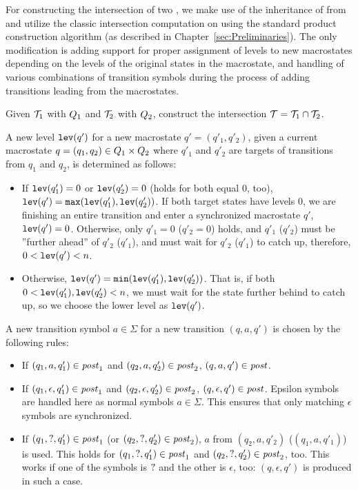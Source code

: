 For constructing the intersection of two \nfts, we make use of the inheritance of \nfts from \nfas and utilize the classic intersection computation on \nfa using the standard product construction algorithm (as described in Chapter~\ref{sec:Preliminaries}).
The only modification is adding support for proper assignment of levels to new macrostates depending on the levels of the original \nft states in the macrostate, and handling of various combinations of transition symbols during the process of adding transitions leading from the macrostates.

Given $\mathcal{T}_1$ with $Q_1$ and $\mathcal{T}_2$ with $Q_2$, construct the intersection $\mathcal{T} = \mathcal{T}_1 \cap \mathcal{T}_2$.

A new level $\texttt{lev}(q')$ for a new macrostate $q' = (q'_1, q'_2)$, given a current macrostate $q = (q_1, q_2) \in Q_1 \times Q_2$ where $q'_1$ and $q'_2$ are targets of transitions from $q_1$ and $q_2$, is determined as follows:
\begin{itemize}
  \item If $\texttt{lev}(q'_1) = 0$ or $\texttt{lev}(q'_2) = 0$ (holds for both equal $0$, too),\\ $\texttt{lev}(q') = \texttt{max}(\texttt{lev}(q'_1), \texttt{lev}(q'_2))$. If both target states have levels $0$, we are finishing an entire \nft transition and enter a synchronized macrostate $q'$, $\texttt{lev}(q') = 0$. Otherwise, only $q'_1 = 0$ ($q'_2 = 0$) holds, and $q'_1$ ($q'_2$) must be ''further ahead'' of $q'_2$ ($q'_1$), and must wait for $q'_2$ ($q'_1$) to catch up, therefore, $0 < \texttt{lev}(q') < n$.
  \item Otherwise, $\texttt{lev}(q') = \texttt{min}(\texttt{lev}(q'_1), \texttt{lev}(q'_2))$. That is, if both $0 < \texttt{lev}(q'_1), \texttt{lev}(q'_2) < n$, we must wait for the state further behind to catch up, so we choose the lower level as $\texttt{lev}(q')$.
\end{itemize}

A new transition symbol $a \in \Sigma$ for a new transition $(q, a, q')$ is chosen by the following rules:
\begin{itemize}
  \item If $(q_1, a, q'_1) \in \mathit{post}_1$ and $(q_2, a, q'_2) \in \mathit{post}_2$, $(q, a, q') \in \mathit{post}$.
  \item If $(q_1, \epsilon, q'_1) \in \mathit{post}_1$ and $(q_2, \epsilon, q'_2) \in \mathit{post}_2$, $(q, \epsilon, q') \in \mathit{post}$. Epsilon symbols are handled here as normal symbols $a \in \Sigma$. This ensures that only matching $\epsilon$ symbols are synchronized.
  \item If $(q_1, ?, q'_1) \in \mathit{post}_1$ (or $(q_2, ?, q'_2) \in \mathit{post}_2$), $a$ from $(q_2, a, q'_2)$ ($(q_1, a, q'_1)$) is used.
  This holds for $(q_1, ?, q'_1) \in \mathit{post}_1$ and $(q_2, ?, q'_2) \in \mathit{post}_2$, too.
  This works if one of the symbols is $?$ and the other is $\epsilon$, too: $(q, \epsilon, q')$ is produced in such a case.
\end{itemize}

